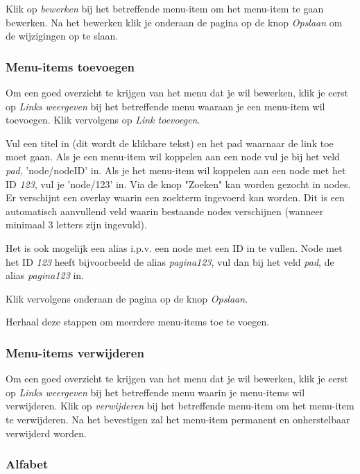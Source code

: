 Klik op \emph{bewerken} bij het betreffende menu-item om het menu-item te gaan bewerken. Na het bewerken klik je onderaan de pagina op de knop \emph{Opslaan} om de wijzigingen op te slaan.


\subsubsection{Menu-items toevoegen}\label{menuitemstoevoegen}

Om een goed overzicht te krijgen van het menu dat je wil bewerken, klik je eerst op \emph{Links weergeven} bij het betreffende menu waaraan je een menu-item wil toevoegen. Klik vervolgens op \emph{Link toevoegen}. 

Vul een titel in (dit wordt de klikbare tekst) en het pad waarnaar de link toe moet gaan. Als je een menu-item wil koppelen aan een node vul je bij het veld \emph{pad}, 'node/nodeID' in. Als je het menu-item wil koppelen aan een node met het ID \emph{123}, vul je 'node/123' in. Via de knop "Zoeken" kan worden gezocht in nodes. Er verschijnt een overlay waarin een zoekterm ingevoerd kan worden. Dit is een automatisch aanvullend veld waarin bestaande nodes verschijnen (wanneer minimaal 3 letters zijn ingevuld).

Het is ook mogelijk een alias i.p.v. een node met een ID in te vullen. Node met het ID \emph{123} heeft bijvoorbeeld de alias \emph{pagina123}, vul dan bij het veld \emph{pad}, de alias \emph{pagina123} in. 

Klik vervolgens onderaan de pagina op de knop \emph{Opslaan}.

Herhaal deze stappen om meerdere menu-items toe te voegen.  

\subsubsection{Menu-items verwijderen}\label{menuitemsverwijderen}

Om een goed overzicht te krijgen van het menu dat je wil bewerken, klik je eerst op \emph{Links weergeven} bij het betreffende menu waarin je menu-items wil verwijderen. Klik op \emph{verwijderen} bij het betreffende menu-item om het menu-item te verwijderen. Na het bevestigen zal het menu-item permanent en onherstelbaar verwijderd worden.


\subsubsection{Alfabet}\label{alfabet}

